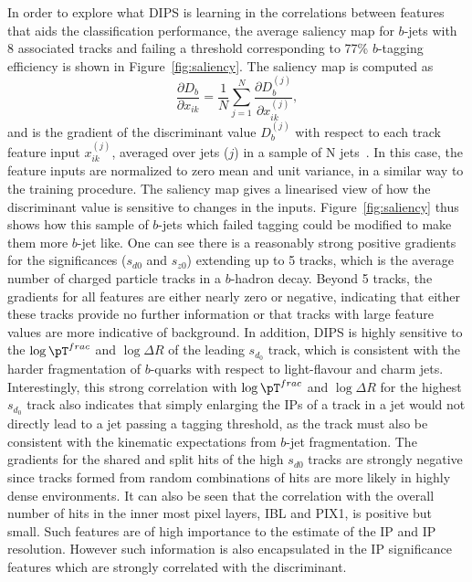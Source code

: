 In order to explore what DIPS is learning in the correlations between features that aids the classification performance, the average saliency map for $b$-jets with 8 associated tracks and failing a threshold corresponding to 77\% $b$-tagging efficiency is shown in Figure~\ref{fig:saliency}. 
The saliency map is computed as 
\begin{equation}
\frac{\partial D_b}{\partial x_{ik}} = \frac{1}{N} \sum_{j=1}^N \frac{\partial D_b^{(j)}}{\partial x_{ik}^{(j)}}, 
\label{eq:salmap}
\end{equation}
and is the gradient of the discriminant value $D_b^{(j)}$ with respect to each track feature input $x_{ik}^{(j)}$, averaged over jets ($j$) in a sample of N jets~\cite{simonyan2013deep}.  
In this case, the feature inputs are normalized to zero mean and unit variance, in a similar way to the training procedure. 
The saliency map gives a linearised view of how the discriminant value is sensitive to changes in the inputs. Figure~\ref{fig:saliency} thus shows how  this sample of $b$-jets which failed tagging could be modified to make them more $b$-jet like.
One can see there is a reasonably strong positive gradients for the significances ($s_{d0}$ and $s_{z0}$) extending up to 5 tracks, which is the average number of charged particle tracks in a $b$-hadron decay. 
Beyond 5 tracks, the gradients for all features are either nearly zero or negative, indicating that either these tracks provide no further information or that tracks with large feature values are more indicative of background. 
In addition, DIPS is highly sensitive to the $\log \pT^{frac}$ and $\log \Delta R$ of the leading $s_{d_0}$ track, which is consistent with the harder fragmentation of $b$-quarks with respect to light-flavour and charm jets. Interestingly, this strong correlation with $\log \pT^{frac}$ and $\log \Delta R$ for the highest $s_{d_0}$ track also indicates that simply enlarging the IPs of a track in a jet would not directly lead to a jet passing a tagging threshold, as the track must also be consistent with the kinematic expectations from $b$-jet fragmentation.
The gradients for the shared and split hits of the high $s_{d0}$ tracks are strongly negative since tracks formed from random combinations of hits are more likely in highly dense environments.
It can also be seen that the correlation with the overall number of hits in the inner most pixel layers, IBL and PIX1, is positive but small. Such features are of high importance to the estimate of the IP and IP resolution. However such information is also encapsulated in the IP significance features which are strongly correlated with the discriminant. 
